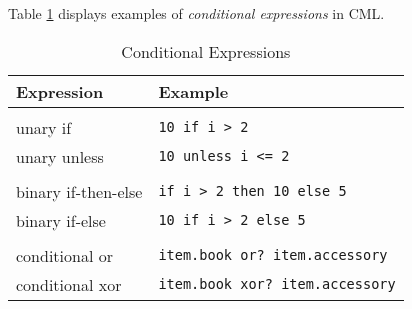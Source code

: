 Table \ref{tab:conditional-expr-examples} displays examples of
\emph{conditional expressions} in CML.

\begin{table}[H]
\centering
\begin{tabular}
{ l l }
\hline
Expression & Example \\
\hline
\\
unary if & \verb|10 if i > 2| \\
unary unless & \verb|10 unless i <= 2| \\
\\
binary if-then-else & \verb|if i > 2 then 10 else 5| \\
binary if-else & \verb|10 if i > 2 else 5| \\
\\
conditional or & \verb|item.book or? item.accessory| \\
conditional xor & \verb|item.book xor? item.accessory| \\
\end{tabular}
\caption{Conditional Expressions}
\label{tab:conditional-expr-examples}
\end{table}

